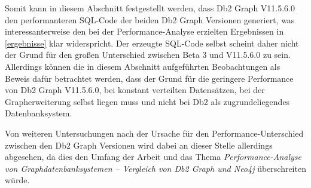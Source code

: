 Somit kann in diesem Abschnitt festgestellt werden, dass Db2 Graph V11.5.6.0 den performanteren SQL-Code der beiden Db2 Graph Versionen generiert, was interessanterweise den bei der Performance-Analyse erzielten Ergebnissen in \autoref{ergebnisse} klar widerspricht. Der erzeugte SQL-Code selbst scheint daher nicht der Grund für den großen Unterschied zwischen Beta 3 und V11.5.6.0 zu sein. Allerdings können die in diesem Abschnitt aufgeführten Beobachtungen als Beweis dafür betrachtet werden, dass der Grund für die geringere Performance von Db2 Graph V11.5.6.0, bei konstant verteilten Datensätzen, bei der Grapherweiterung selbst liegen muss und nicht bei Db2 als zugrundeliegendes Datenbanksystem. 

Von weiteren Untersuchungen nach der Ursache für den Performance-Unterschied zwischen den Db2 Graph Versionen wird dabei an dieser Stelle allerdings abgesehen, da dies den Umfang der Arbeit und das Thema \textit{Performance-Analyse von Graphdatenbanksystemen -- Vergleich von Db2 Graph und Neo4j} überschreiten würde.